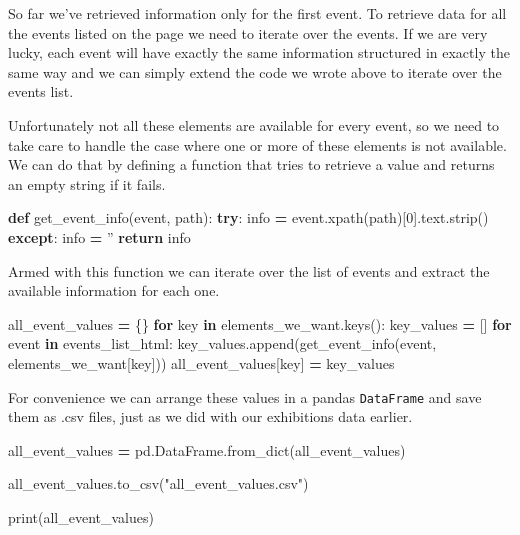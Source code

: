 \documentclass[]{book}
\newenvironment{Shaded}{\begin{snugshade}}{\end{snugshade}}
\newcommand{\BuiltInTok}[1]{#1}
\newcommand{\ControlFlowTok}[1]{\textcolor[rgb]{0.13,0.29,0.53}{\textbf{#1}}}
\newcommand{\DecValTok}[1]{\textcolor[rgb]{0.00,0.00,0.81}{#1}}
\newcommand{\KeywordTok}[1]{\textcolor[rgb]{0.13,0.29,0.53}{\textbf{#1}}}
\newcommand{\NormalTok}[1]{#1}
\newcommand{\OperatorTok}[1]{\textcolor[rgb]{0.81,0.36,0.00}{\textbf{#1}}}
\newcommand{\StringTok}[1]{\textcolor[rgb]{0.31,0.60,0.02}{#1}}
\begin{document}
So far we've retrieved information only for the first event. To
retrieve data for all the events listed on the page we need to iterate
over the events. If we are very lucky, each event will have exactly
the same information structured in exactly the same way and we can
simply extend the code we wrote above to iterate over the events list.

Unfortunately not all these elements are available for every event, so
we need to take care to handle the case where one or more of these
elements is not available. We can do that by defining a function that
tries to retrieve a value and returns an empty string if it fails.

\begin{Shaded}
\begin{Highlighting}[]
\KeywordTok{def}\NormalTok{ get_event_info(event, path):}
    \ControlFlowTok{try}\NormalTok{:}
\NormalTok{        info }\OperatorTok{=}\NormalTok{ event.xpath(path)[}\DecValTok{0}\NormalTok{].text.strip()}
    \ControlFlowTok{except}\NormalTok{:}
\NormalTok{        info }\OperatorTok{=} \StringTok{''}
    \ControlFlowTok{return}\NormalTok{ info}
\end{Highlighting}
\end{Shaded}

Armed with this function we can iterate over the list of events and
extract the available information for each one.

\begin{Shaded}
\begin{Highlighting}[]
\NormalTok{all_event_values }\OperatorTok{=}\NormalTok{ \{\}}
\ControlFlowTok{for}\NormalTok{ key }\KeywordTok{in}\NormalTok{ elements_we_want.keys():}
\NormalTok{    key_values }\OperatorTok{=}\NormalTok{ []}
    \ControlFlowTok{for}\NormalTok{ event }\KeywordTok{in}\NormalTok{ events_list_html: }
\NormalTok{        key_values.append(get_event_info(event, elements_we_want[key]))}
\NormalTok{    all_event_values[key] }\OperatorTok{=}\NormalTok{ key_values}
\end{Highlighting}
\end{Shaded}

For convenience we can arrange these values in a pandas \texttt{DataFrame}
and save them as .csv files, just as we did with our exhibitions data earlier.

\begin{Shaded}
\begin{Highlighting}[]
\NormalTok{all_event_values }\OperatorTok{=}\NormalTok{ pd.DataFrame.from_dict(all_event_values)}

\NormalTok{all_event_values.to_csv(}\StringTok{"all_event_values.csv"}\NormalTok{)}

\BuiltInTok{print}\NormalTok{(all_event_values)}
\end{Highlighting}
\end{Shaded}
\end{document}
